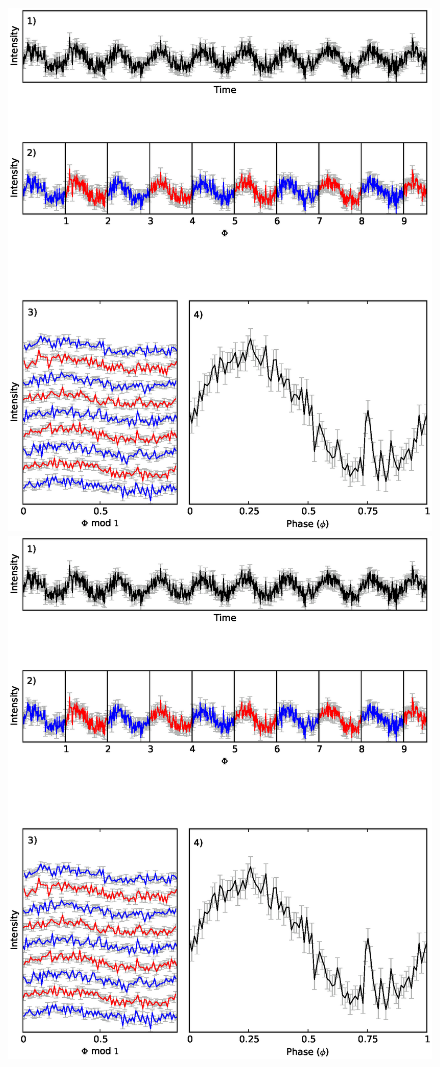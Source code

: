 \begin{figure}
    \includegraphics[width=\columnwidth, trim = 0mm 220mm 0mm 0mm,clip]{images/folding.eps}
    \includegraphics[width=\columnwidth, trim = 0mm 155mm 0mm 65mm,clip]{images/folding.eps}

\end{figure}
